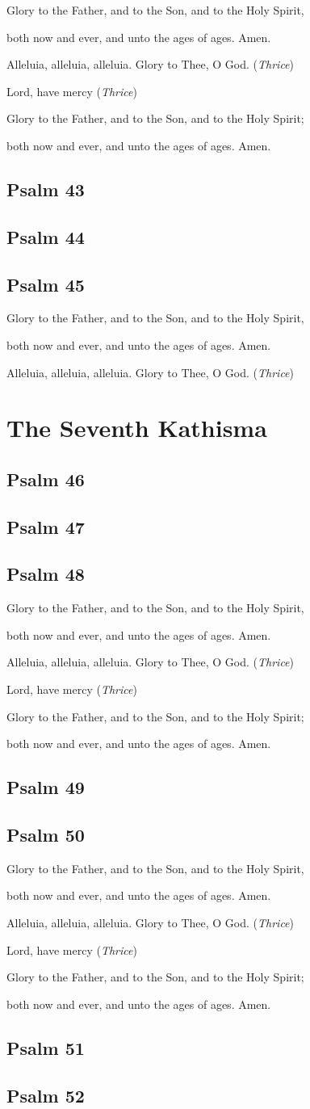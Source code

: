 \documentclass[12pt,openany]{book}
\newcommand{\kathismabreak}{
  \medskip
  \begin{center}
  \begin{footnotesize}
  Glory to the Father, and to the Son, and to the Holy Spirit,
  
  both now and ever, and unto the ages of ages. Amen.

  Alleluia, alleluia, alleluia. Glory to Thee, O God. (\textit{Thrice})

  Lord, have mercy (\textit{Thrice})

  Glory to the Father, and to the Son, and to the Holy Spirit;
  
  both now and ever, and unto the ages of ages. Amen.
  \end{footnotesize}
  \end{center}
  \smallbreak
}
\newcommand{\kathismaend}{
  \medskip
  \begin{center}
  \begin{footnotesize}
  Glory to the Father, and to the Son, and to the Holy Spirit,
  
  both now and ever, and unto the ages of ages. Amen.

  Alleluia, alleluia, alleluia. Glory to Thee, O God. (\textit{Thrice})
  \end{footnotesize}
  \end{center}
  \smallbreak
}
\begin{document}
\kathismabreak
\smallskip
\section{Psalm 43}

\smallskip
\section{Psalm 44}

\smallskip
\section{Psalm 45}


\kathismaend

\chapter*{The Seventh Kathisma}
\smallskip
\section{Psalm 46}

\smallskip
\section{Psalm 47}

\smallskip
\section{Psalm 48}


\kathismabreak
\bigskip
\section{Psalm 49}

\smallskip
\pagebreak %
\section{Psalm 50}


\kathismabreak
\section{Psalm 51}

\section{Psalm 52}

\end{document}
